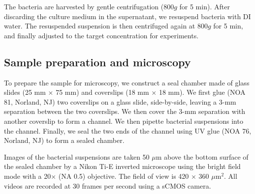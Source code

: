 \documentclass[twocolumn,aps,prx,amsmath,amssymb,longbibliography]{revtex4-2}
\begin{document}
The bacteria are harvested by gentle centrifugation ($800g$ for 5 min). After discarding the culture medium in the supernatant, we resuspend bacteria with DI water. The resuspended suspension is then centrifuged again at $800g$ for 5 min, and finally adjusted to the target concentration for experiments.

\subsection{Sample preparation and microscopy}

To prepare the sample for microscopy, we construct a seal chamber made of glass slides (25 mm $\times$ 75 mm) and coverslips (18 mm $\times$ 18 mm). We first glue (NOA 81, Norland, NJ) two coverslips on a glass slide, side-by-side, leaving a 3-mm separation between the two coverslips. We then cover the 3-mm separation with another coverslip to form a channel. We then pipette bacterial suspensions into the channel. Finally, we seal the two ends of the channel using UV glue (NOA 76, Norland, NJ) to form a sealed chamber.

Images of the bacterial suspensions are taken 50 $\mu$m above the bottom surface of the sealed chamber by a Nikon Ti-E inverted microscope using the bright field mode with a 20$\times$ (NA 0.5) objective. The field of view is 420 $\times$ 360 $\mu$m$^2$. All videos are recorded at 30 frames per second using a sCMOS camera.


\end{document}
